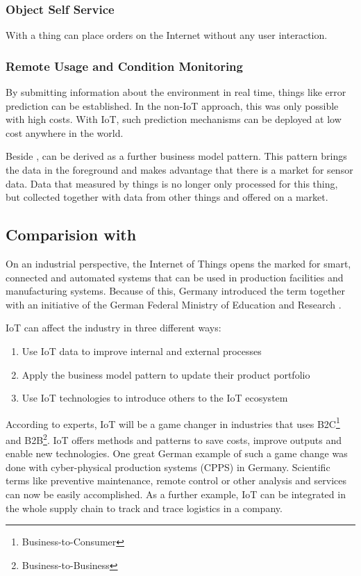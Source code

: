 \subsubsection{Object Self Service}
With  a thing can place orders on the Internet without any user interaction.

\subsubsection{Remote Usage and Condition Monitoring}
By submitting information about the environment in real time, things like error prediction can be established. In the non-IoT approach, this was only possible with high costs. With IoT, such prediction mechanisms can be deployed at low cost anywhere in the world.

Beside ,  can be derived as a further business model pattern. This pattern brings the data in the foreground and makes advantage that there is a market for sensor data. Data that measured by things is no longer only processed for this thing, but collected together with data from other things and offered on a market.

\subsection{Comparision with }
On an industrial perspective, the Internet of Things opens the marked for smart, connected and automated systems that can be used in production facilities and manufacturing systems. Because of this, Germany introduced the term  together with an initiative of the German Federal Ministry of Education and Research \cite{iotfleisch2}.

IoT can affect the industry in three different ways: \cite{iotfleisch2}
\begin{enumerate}
	\item Use IoT data to improve internal and external processes
	\item Apply the  business model pattern to update their product portfolio
	\item Use IoT technologies to introduce others to the IoT ecosystem
\end{enumerate}

According to experts, IoT will be a game changer in industries that uses B2C\footnote{Business-to-Consumer} and B2B\footnote{Business-to-Business}. IoT offers methods and patterns to save costs, improve outputs and enable new technologies. One great German example of such a game change was done with cyber-physical production systems (CPPS) in Germany. Scientific terms like preventive maintenance, remote control or other analysis and services can now be easily accomplished. As a further example, IoT can be integrated in the whole supply chain to track and trace logistics in a company. \cite{iotfleisch2}

